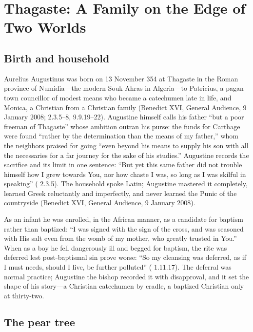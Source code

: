 \section{Thagaste: A Family on the Edge of Two Worlds}

\subsection{Birth and household}

Aurelius Augustinus was born on 13 November 354 at Thagaste in the Roman
province of Numidia---the modern Souk Ahras in Algeria---to Patricius, a
pagan town councillor of modest means who became a catechumen late in life,
and Monica, a Christian from a Christian family (Benedict XVI, General
Audience, 9 January 2008;  2.3.5--8, 9.9.19--22). Augustine
himself calls his father ``but a poor freeman of Thagaste'' whose ambition
outran his purse: the funds for Carthage were found ``rather by the
determination than the means of my father,'' whom the neighbors praised for
going ``even beyond his means to supply his son with all the necessaries for
a far journey for the sake of his studies.'' Augustine records the sacrifice
and its limit in one sentence: ``But yet this same father did not trouble
himself how I grew towards You, nor how chaste I was, so long as I was
skilful in speaking'' ( 2.3.5). The household
spoke Latin; Augustine mastered it completely, learned Greek reluctantly and
imperfectly, and never learned the Punic of the countryside (Benedict XVI,
General Audience, 9 January 2008).

As an infant he was enrolled, in the African manner, as a candidate for
baptism rather than baptized: ``I was signed with the sign of the cross, and
was seasoned with His salt even from the womb of my mother, who greatly
trusted in You.'' When as a boy he fell dangerously ill and begged for
baptism, the rite was deferred lest post-baptismal sin prove worse: ``So my
cleansing was deferred, as if I must needs, should I live, be further
polluted'' ( 1.11.17). The deferral was normal practice;
Augustine the bishop recorded it with disapproval, and it set the shape of
his story---a Christian catechumen by cradle, a baptized Christian only at
thirty-two.

\subsection{The pear tree}

